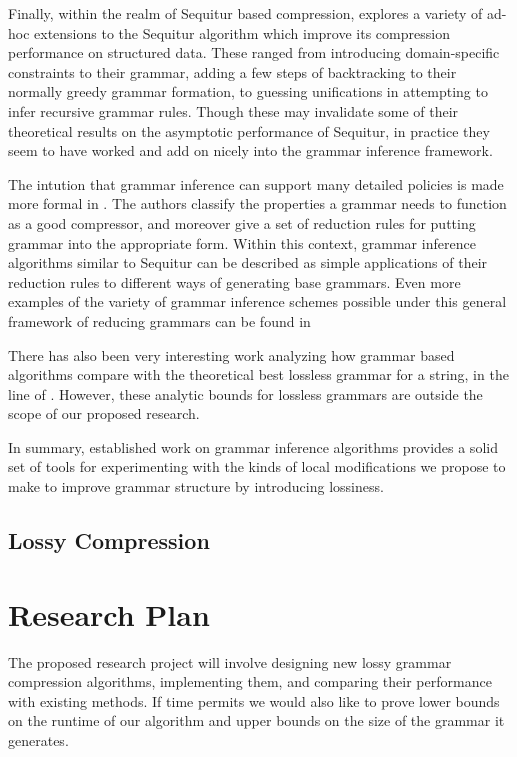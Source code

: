 \documentclass[11pt]{article}
\begin{document}
Finally, within the realm of Sequitur based compression, \cite{nevillphd} explores a variety
of ad-hoc extensions to the Sequitur algorithm which improve its compression performance
on structured data. These ranged from introducing domain-specific constraints to their
grammar, adding a few steps of backtracking to their normally greedy grammar formation,
to guessing unifications in attempting to infer recursive grammar rules. Though these
may invalidate some of their theoretical results on the asymptotic performance of
Sequitur, in practice they seem to have worked and add on nicely into the grammar inference
framework.

The intution that grammar inference can support many detailed policies is made more formal
in \cite{grammarcodes}. The authors classify the properties a grammar needs to function
as a good compressor, and moreover give a set of reduction rules for putting grammar into
the appropriate form. Within this context, grammar inference algorithms similar to Sequitur
can be described as simple applications of their reduction rules to different ways
of generating base grammars. Even more examples of the variety of grammar inference schemes
possible under this general framework of reducing grammars can be found in 
\cite{efficientgreedy}

There has also been very interesting work analyzing how grammar based algorithms compare with
the theoretical best lossless grammar for a string, in the line of \cite{approximate}. However,
these analytic bounds for lossless grammars are outside the scope of our proposed research.

In summary, established work on grammar inference algorithms provides a solid set of tools
for experimenting with the kinds of local modifications we propose to make to improve
grammar structure by introducing lossiness.

\subsection{Lossy Compression}

\section{Research Plan}

The proposed research project will involve designing new lossy grammar compression
algorithms, implementing them, and comparing their performance with existing methods.
If time permits we would also like to prove lower bounds on the runtime of our
algorithm and upper bounds on the size of the grammar it generates.
\end{document}
